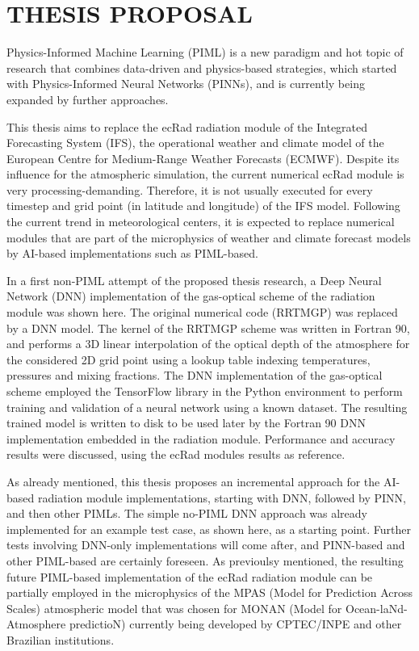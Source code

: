 \chapter{THESIS PROPOSAL}
\label{ch:prop}

Physics-Informed Machine Learning (PIML) is a new paradigm and hot topic of research that combines data-driven and physics-based strategies, which started with Physics-Informed Neural Networks (PINNs), and is currently being expanded by further approaches.  

This thesis aims to replace the ecRad radiation module of the Integrated Forecasting System (IFS), the operational weather and climate model of the European Centre for Medium-Range Weather Forecasts (ECMWF). Despite its influence for the atmospheric simulation, the current numerical ecRad module is very processing-demanding. Therefore, it is not usually executed for every timestep and grid point (in latitude and longitude) of the IFS model. Following the current trend in meteorological centers, it is expected to replace numerical modules that are part of the microphysics of weather and climate forecast models by AI-based implementations such as PIML-based.

In a first non-PIML attempt of the proposed thesis research, a Deep Neural Network (DNN) implementation of the gas-optical scheme of the radiation module was shown here. The original numerical code (RRTMGP) was replaced by a DNN model. The kernel of the RRTMGP scheme was written in Fortran 90, and performs a 3D linear interpolation of the optical depth of the atmosphere for the considered 2D grid point using a lookup table indexing temperatures, pressures and mixing fractions. The DNN implementation of the gas-optical scheme employed the TensorFlow library in the Python environment to perform training and validation of a neural network using a known dataset. The resulting trained model is written to disk to be used later by the Fortran 90 DNN implementation embedded in the radiation module. Performance and accuracy results were discussed, using the ecRad modules results as reference.

As already mentioned, this thesis proposes an incremental approach for the AI-based radiation module implementations, starting with DNN, followed by PINN, and then other PIMLs. The simple no-PIML DNN approach was already implemented for an example test case, as shown here, as a starting point. Further tests involving DNN-only implementations will come after, and PINN-based and other PIML-based are certainly foreseen.    
As previoulsy mentioned, the resulting future PIML-based implementation of the ecRad radiation module can be partially employed in the microphysics of the MPAS (Model for Prediction Across Scales) atmospheric model that was chosen for MONAN (Model for Ocean-laNd-Atmosphere predictioN) currently being developed by CPTEC/INPE and other Brazilian institutions.

